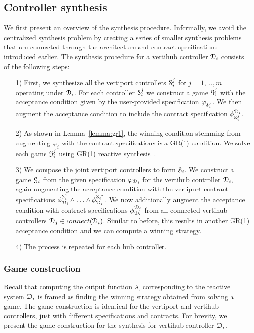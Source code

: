 \subsection{Controller synthesis}
We first present an overview of the synthesis procedure. Informally, we avoid the centralized synthesis problem by creating a series of smaller synthesis problems that are connected through the architecture and contract specifications introduced earlier.
The synthesis procedure for a vertihub controller $\mathcal{D}_i$ consists of the following steps:
\begin{itemize}
 \item[1)] First, we synthesize all the vertiport controllers $\mathcal{S}_i^j$ for $j=1,\ldots,m$ operating under $\mathcal{D}_i$. For each controller $\mathcal{S}_i^j$ we construct a game $\mathcal{G}_{i}^j$ with the acceptance condition given by the user-provided specification $\varphi_{\mathcal{S}_i^j}$. We then augment the acceptance condition to include the contract specification $\phi_{\mathcal{S}_i^j}^{\mathcal{D}_i}$. 
  \item[2)] As shown in Lemma~\ref{lemma:gr1}, the winning condition stemming from augmenting $\varphi_i$ with the contract specifications is a GR(1) condition. We solve each game $\mathcal{G}_{i}^j$ using GR(1) reactive synthesis~\cite{bloem2012}. 
  \item[3)] We compose the joint vertiport controllers to form $\mathcal{S}_i$. We construct a game $\mathcal{G}_{i}$ from the given specification $\varphi_{\mathcal{D}_i}$ for the vertihub controller $\mathcal{D}_i$, again augmenting the acceptance condition with the vertiport contract specifications $\phi^{\mathcal{S}_i^1}_{\mathcal{D}_i} \wedge \ldots \wedge \phi^{\mathcal{S}_i^m}_{\mathcal{D}_i}$. We now additionally augment the acceptance condition with contract specifications $\phi_{\mathcal{D}_i}^{\mathcal{D}_j}$ from all connected vertihub controllers $\mathcal{D}_j \in connect(\mathcal{D}_i)$. Similar to before, this results in another GR(1) acceptance condition and we can compute a winning strategy. 
\item[4)] The process is repeated for each hub controller.
\end{itemize}



\subsubsection{Game construction}
Recall that computing the output function $\lambda_i$ corresponding to the reactive system $\mathcal{D}_i$ is framed as finding the winning strategy obtained from solving a game. The game construction is identical for the vertiport and vertihub controllers, just with different specifications and contracts. For brevity, we present the game construction for the synthesis for vertihub controller $\mathcal{D}_i$.

